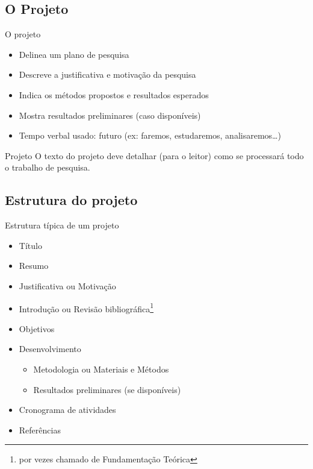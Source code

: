 \documentclass{beamer}
\begin{document}
\subsection{O Projeto}

\begin{frame}{O projeto}
  \begin{itemize}
  \item Delinea um \alert{plano} de pesquisa
  \item Descreve a justificativa e motivação da pesquisa
  \item Indica os métodos propostos e resultados esperados
  \item Mostra resultados preliminares (caso disponíveis)
  \item Tempo verbal usado: \alert{futuro} (ex: faremos, estudaremos,
    analisaremos\ldots)
  \end{itemize}
\end{frame}

\begin{frame}
  \begin{block}{Projeto}
    O texto do projeto deve detalhar (para o leitor) como se processará
    todo o trabalho de pesquisa.
  \end{block}
\end{frame}

\subsection{Estrutura do projeto}

\begin{frame}{Estrutura típica de um projeto}
  \begin{itemize}
  \item Título
  \item Resumo
  \item Justificativa ou Motivação
  \item Introdução ou Revisão bibliográfica\footnote{por vezes chamado
      de Fundamentação Teórica}
  \item Objetivos
  \item Desenvolvimento
    \begin{itemize}
    \item Metodologia ou Materiais e Métodos
    \item Resultados preliminares (se disponíveis)
    \end{itemize}
  \item Cronograma de atividades
  \item Referências
  \end{itemize}
\end{frame}
\end{document}
